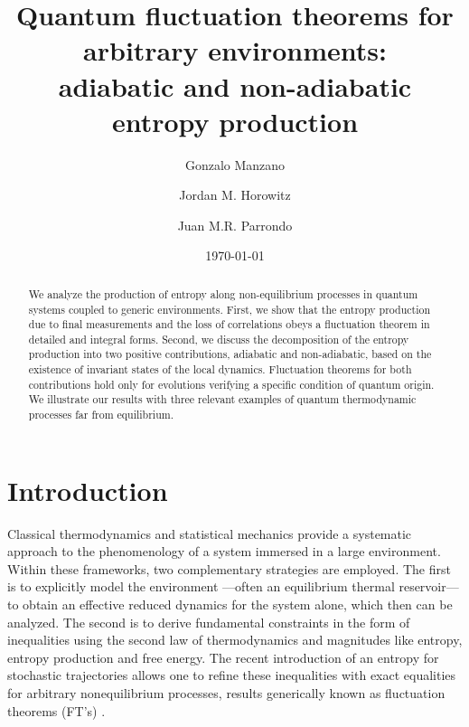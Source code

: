 \documentclass[aps,prx,twocolumn,showpacs,floatfix,superscriptaddress,graphics,longbibliography]{revtex4-1}
\begin{document}
 
\title{Quantum fluctuation theorems for arbitrary environments: \\ adiabatic and non-adiabatic entropy production}
\author{Gonzalo Manzano}
\author{Jordan M. Horowitz}
\author{Juan M.R. Parrondo}



\date{\today}

\begin{abstract}
We analyze the production of entropy along non-equilibrium processes in quantum systems coupled to generic environments. 
First, we show that the entropy production due to final measurements and the loss of correlations obeys a fluctuation theorem in detailed and integral forms. 
Second, we discuss the decomposition of the entropy production into two positive contributions, adiabatic and non-adiabatic, based on the existence of invariant states of the local dynamics. 
Fluctuation theorems for both contributions hold only for evolutions verifying a specific condition of quantum origin.
We illustrate our results with three relevant examples of quantum thermodynamic processes far from equilibrium.
\end{abstract}

\maketitle
 
\section{Introduction}

Classical thermodynamics and statistical mechanics provide a systematic approach to the phenomenology of a system immersed in a large environment.
Within these frameworks, two complementary strategies are employed.
The first is to explicitly model the environment ---often an equilibrium thermal reservoir--- to obtain an effective reduced dynamics for the system alone, which then can be analyzed.
The second is to derive fundamental constraints in the form of inequalities using the second law of thermodynamics and magnitudes like entropy, entropy production and free energy.
The recent introduction of an entropy for stochastic trajectories \cite{SeifertPRL} allows one to refine these inequalities with exact equalities for arbitrary nonequilibrium processes, 
results generically known as fluctuation theorems (FT's) \cite{SeifertREV, JarzynskiREV}.
\end{document}

